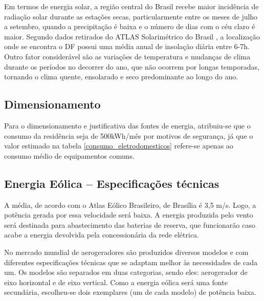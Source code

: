 	Em termos de energia solar, a região central do Brasil recebe maior incidência de radiação solar durante as estações secas, particularmente entre os meses de julho a setembro, quando a precipitação é baixa e o número de dias com o céu claro é maior. Segundo dados retirados do ATLAS Solarimétrico do Brasil \cite{2000UFPE}, a localização onde se encontra o DF possui uma média anual de insolação diária entre 6-7h. Outro fator considerável são as variações de temperatura e mudanças de clima durante os períodos no decorrer do ano, que não ocorrem por longas temporadas, tornando o clima quente, ensolarado e seco predominante ao longo do ano.

\subsection{Dimensionamento}

	Para o dimensionamento e justificativa das fontes de energia, atribuiu-se que o consumo da residência seja de 500kWh/mês por motivos de segurança, já que o valor estimado na tabela \ref{consumo_eletrodomesticos} refere-se apenas ao consumo médio de equipamentos comuns.

\subsection{Energia Eólica -- Especificações técnicas}

	A média, de acordo com o Atlas Eólico Brasileiro, de Brasília é 3,5 m/s. Logo, a potência gerada por essa velocidade será baixa. A energia produzida pelo vento será destinada para abastecimento das baterias de reserva, que funcionarão caso acabe a energia devolvida pela concessionária da rede elétrica.

	No mercado mundial de aerogeradores são produzidos diversos modelos e com diferentes especificações técnicas que se adaptam melhor às necessidades de cada um. Os modelos são separados em duas categorias, sendo eles: aerogerador de eixo horizontal e de eixo vertical. Como a energia eólica será uma fonte secundária, escolheu-se dois exemplares (um de cada modelo) de potência baixa.

\newpage

